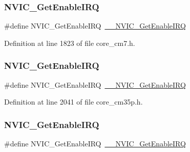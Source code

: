 \subsubsection{\texorpdfstring{N\+V\+I\+C\+\_\+\+Get\+Enable\+I\+RQ}{NVIC\_GetEnableIRQ}\hspace{0.1cm}{\footnotesize\ttfamily [10/13]}}
{\footnotesize\ttfamily \#define N\+V\+I\+C\+\_\+\+Get\+Enable\+I\+RQ~\hyperlink{group___c_m_s_i_s___core___n_v_i_c_functions_gaaeb5e7cc0eaad4e2817272e7bf742083}{\+\_\+\+\_\+\+N\+V\+I\+C\+\_\+\+Get\+Enable\+I\+RQ}}



Definition at line 1823 of file core\+\_\+cm7.\+h.

\mbox{\label{group___c_m_s_i_s___core___n_v_i_c_functions_ga857de13232ec65dd15087eaa15bc4a69}} 
\subsubsection{\texorpdfstring{N\+V\+I\+C\+\_\+\+Get\+Enable\+I\+RQ}{NVIC\_GetEnableIRQ}\hspace{0.1cm}{\footnotesize\ttfamily [11/13]}}
{\footnotesize\ttfamily \#define N\+V\+I\+C\+\_\+\+Get\+Enable\+I\+RQ~\hyperlink{group___c_m_s_i_s___core___n_v_i_c_functions_gaaeb5e7cc0eaad4e2817272e7bf742083}{\+\_\+\+\_\+\+N\+V\+I\+C\+\_\+\+Get\+Enable\+I\+RQ}}



Definition at line 2041 of file core\+\_\+cm35p.\+h.

\mbox{\label{group___c_m_s_i_s___core___n_v_i_c_functions_ga857de13232ec65dd15087eaa15bc4a69}} 
\subsubsection{\texorpdfstring{N\+V\+I\+C\+\_\+\+Get\+Enable\+I\+RQ}{NVIC\_GetEnableIRQ}\hspace{0.1cm}{\footnotesize\ttfamily [12/13]}}
{\footnotesize\ttfamily \#define N\+V\+I\+C\+\_\+\+Get\+Enable\+I\+RQ~\hyperlink{group___c_m_s_i_s___core___n_v_i_c_functions_gaaeb5e7cc0eaad4e2817272e7bf742083}{\+\_\+\+\_\+\+N\+V\+I\+C\+\_\+\+Get\+Enable\+I\+RQ}}



